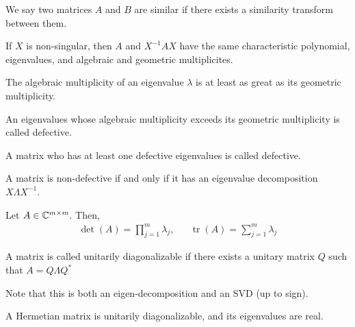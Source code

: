\documentclass[12pt]{article}
\begin{document}
\begin{definition}
We say two matrices \( A \) and \( B \) are similar if there exists a similarity transform between them.
\end{definition}

\begin{theorem}
If \( X \) is non-singular, then \( A \) and \( X^{-1}AX \) have the same characteristic polynomial, eigenvalues, and algebraic and geometric multiplicites.
\end{theorem}

\begin{theorem}
The algebraic multiplicity of an eigenvalue \( \lambda \) is at least as great as its geometric multiplicity.
\end{theorem}

\begin{definition}
An eigenvalues whose algebraic multiplicity exceeds its geometric multiplicity is called defective.
\end{definition}

\begin{definition}
A matrix who has at least one defective eigenvalues is called defective.
\end{definition}

\begin{theorem}
A matrix is non-defective if and only if it has an eigenvalue decomposition \( X\Lambda X^{-1} \).
\end{theorem}

\begin{theorem}
Let \( A\in\mathbb{C}^{m\times m} \). Then,
\begin{align*}
    \det(A) = \prod_{j=1}^{m} \lambda_j, && \operatorname{tr}(A) = \sum_{j=1}^{m} \lambda_j
\end{align*}
\end{theorem}

\begin{definition}
A matrix is called unitarily diagonalizable if there exists a unitary matrix \( Q \) such that \( A = Q\Lambda Q^* \)
\end{definition}

Note that this is both an eigen-decomposition and an SVD (up to sign).

\begin{theorem}
A Hermetian matrix is unitarily diagonalizable, and its eigenvalues are real.
\end{theorem}
\end{document}
